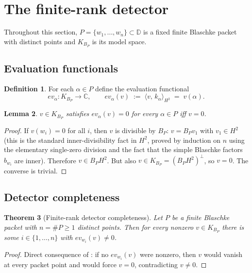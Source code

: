\documentclass[12pt]{article}
\newtheorem{theorem}{Theorem}[section]
\newtheorem{lemma}[theorem]{Lemma}
\theoremstyle{definition}
\newtheorem{definition}[theorem]{Definition}
\theoremstyle{remark}
\newcommand{\C}{\mathbb{C}}
\newcommand{\D}{\mathbb{D}}
\newcommand{\HHH}{H^{2}}
\newcommand{\KBP}{K_{B_{P}}}
\newcommand{\inner}[2]{\langle #1,\,#2\rangle}
\begin{document}
\section{The finite-rank detector}\label{sec:detector}

Throughout this section, $P=\{w_{1},\dots,w_{n}\}\subset\D$ is a fixed
finite Blaschke packet with distinct points and $\KBP$ is its model
space.

\subsection{Evaluation functionals}

\begin{definition}\label{def:eval}
For each $\alpha\in P$ define the evaluation functional
\[
  ev_{\alpha}:\KBP\to\C,\qquad ev_{\alpha}(v)\;:=\;\inner{v}{k_{\alpha}}_{\HHH}\;=\;v(\alpha).
\]
\end{definition}

\begin{lemma}\label{lem:eval-vanishes}
$v\in\KBP$ satisfies $ev_{\alpha}(v)=0$ for every $\alpha\in P$ iff
$v=0$.
\end{lemma}

\begin{proof}
If $v(w_{i})=0$ for all $i$, then $v$ is divisible by $B_{P}$:
$v=B_{P}v_{1}$ with $v_{1}\in\HHH$ (this is the standard inner-divisibility
fact in $\HHH$, proved by induction on $n$ using the elementary
single-zero division and the fact that the simple Blaschke factors
$b_{w_{i}}$ are inner). Therefore $v\in B_{P}\HHH$. But also
$v\in\KBP=(B_{P}\HHH)^{\perp}$, so $v=0$. The converse is trivial.
\end{proof}

\subsection{Detector completeness}

\begin{theorem}[Finite-rank detector completeness]\label{thm:detector-complete}
Let $P$ be a finite Blaschke packet with $n=\#P\ge1$ distinct points.
Then for every nonzero $v\in\KBP$ there is some $i\in\{1,\dots,n\}$ with
$ev_{w_{i}}(v)\neq0$.
\end{theorem}

\begin{proof}
Direct consequence of : if no $ev_{w_{i}}(v)$
were nonzero, then $v$ would vanish at every packet point and
 would force $v=0$, contradicting $v\neq0$.
\end{proof}
\end{document}
